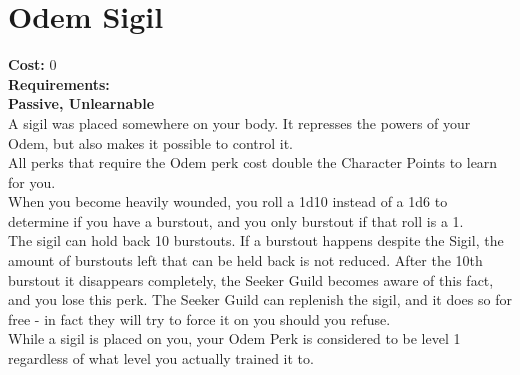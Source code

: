 \section{Odem Sigil}\label{perk:odemSigil}
\textbf{Cost:} 0\\
\textbf{Requirements:}\\
\textbf{Passive, Unlearnable}\\
A sigil was placed somewhere on your body.
It represses the powers of your Odem, but also makes it possible to control it.\\
All perks that require the Odem perk cost double the Character Points to learn for you.\\
When you become heavily wounded, you roll a 1d10 instead of a 1d6 to determine if you have a burstout, and you only burstout if that roll is a 1.\\
The sigil can hold back 10 burstouts.
If a burstout happens despite the Sigil, the amount of burstouts left that can be held back is not reduced.
After the 10th burstout it disappears completely, the Seeker Guild becomes aware of this fact, and you lose this perk.
The Seeker Guild can replenish the sigil, and it does so for free - in fact they will try to force it on you should you refuse.\\
While a sigil is placed on you, your Odem Perk is considered to be level 1 regardless of what level you actually trained it to.\\